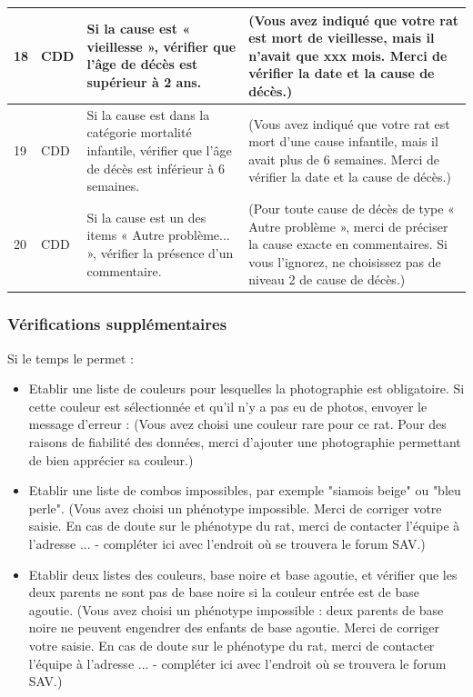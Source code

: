 \documentclass[a4paper,10pt]{article}
\begin{document}
\begin{tabular}{|p{0.35cm}|p{1.35cm}|p{5cm}|p{8.5cm}|}
18 & CDD & Si la cause est « vieillesse », vérifier que l'âge de décès est supérieur à 2 ans. & (Vous avez indiqué que votre rat est mort de vieillesse, mais il n'avait que xxx mois. Merci de vérifier la date et la cause de décès.)\\\hline


19 & CDD & Si la cause est dans la catégorie mortalité infantile, vérifier que l'âge de décès est inférieur à 6 semaines. & (Vous avez indiqué que votre rat est mort d'une cause infantile, mais il avait plus de 6 semaines. Merci de vérifier la date et la cause de décès.)\\\hline


20 & CDD & Si la cause est un des items « Autre problème... », vérifier la présence d'un commentaire. & (Pour toute cause de décès de type « Autre problème », merci de préciser la cause exacte en commentaires. Si vous l'ignorez, ne choisissez pas de niveau 2 de cause de décès.)\\\hline


\end{tabular}
\normalsize

\subsubsection{Vérifications supplémentaires}

Si le temps le permet : 

\begin{itemize}
\item Etablir une liste de couleurs pour lesquelles la photographie est obligatoire. Si cette couleur est sélectionnée et qu'il n'y a pas eu de photos, envoyer le message d'erreur : (Vous avez choisi une couleur rare pour ce rat. Pour des raisons de fiabilité des données, merci d'ajouter une photographie permettant de bien apprécier sa couleur.)
\item Etablir une liste de combos impossibles, par exemple "siamois beige" ou "bleu perle". (Vous avez choisi un phénotype impossible. Merci de corriger votre saisie. En cas de doute sur le phénotype du rat, merci de contacter l'équipe à l'adresse ... - compléter ici avec l'endroit où se trouvera le forum SAV.)
\item Etablir deux listes des couleurs, base noire et base agoutie, et vérifier que les deux parents ne sont pas de base noire si la couleur entrée est de base agoutie. (Vous avez choisi un phénotype impossible : deux parents de base noire ne peuvent engendrer des enfants de base agoutie. Merci de corriger votre saisie. En cas de doute sur le phénotype du rat, merci de contacter l'équipe à l'adresse ... - compléter ici avec l'endroit où se trouvera le forum SAV.)
\end{itemize}
\end{document}
